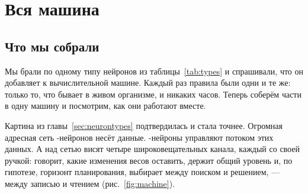 \chapter{Вся машина}
\label{sec:synthesis}

\section{Что мы собрали}

Мы брали по одному типу нейронов из таблицы~\ref{tab:types} и спрашивали, что он добавляет к вычислительной машине. Каждый раз правила были одни и те же: только то, что бывает в живом организме, и никаких часов. Теперь соберём части в одну машину и посмотрим, как они работают вместе.

Картина из главы~\ref{sec:neurontypes} подтвердилась и стала точнее. Огромная адресная сеть -нейронов несёт данные. -нейроны управляют потоком этих данных. А над сетью висят четыре широковещательных канала, каждый со своей ручкой:  говорит, какие изменения весов оставить,  держит общий уровень и, по гипотезе, горизонт планирования,  выбирает между поиском и решением,  --- между записью и чтением (рис.~\ref{fig:machine}).

